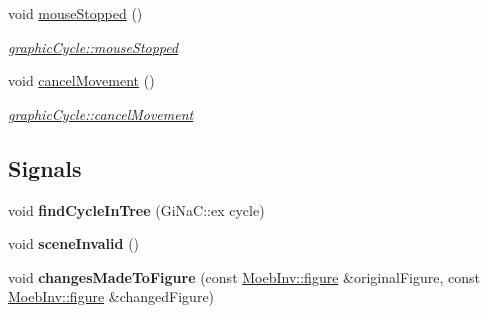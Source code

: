 \begin{DoxyCompactItemize}
void \mbox{\hyperlink{classgraphic_cycle_a173e5e3dfb0dde41c8046a53086e02ab}{mouse\+Stopped}} ()
\begin{DoxyCompactList}\small\item\em \mbox{\hyperlink{classgraphic_cycle_a173e5e3dfb0dde41c8046a53086e02ab}{graphic\+Cycle\+::mouse\+Stopped}} \end{DoxyCompactList}\item 
void \mbox{\hyperlink{classgraphic_cycle_af79bfc4ed813bab595a2a721475a7199}{cancel\+Movement}} ()
\begin{DoxyCompactList}\small\item\em \mbox{\hyperlink{classgraphic_cycle_af79bfc4ed813bab595a2a721475a7199}{graphic\+Cycle\+::cancel\+Movement}} \end{DoxyCompactList}\end{DoxyCompactItemize}
\subsection*{Signals}
\begin{DoxyCompactItemize}
\item 
\mbox{\label{classgraphic_cycle_ae60f6c55734308b7811d0f5ff9116227}} 
void {\bfseries find\+Cycle\+In\+Tree} (Gi\+Na\+C\+::ex cycle)
\item 
\mbox{\label{classgraphic_cycle_aa36164d21bdd1b7cde5b26407f330d49}} 
void {\bfseries scene\+Invalid} ()
\item 
\mbox{\label{classgraphic_cycle_a04f2deb84f4a748e8bb9dba7a43eb653}} 
void {\bfseries changes\+Made\+To\+Figure} (const \mbox{\hyperlink{class_moeb_inv_1_1figure}{Moeb\+Inv\+::figure}} \&original\+Figure, const \mbox{\hyperlink{class_moeb_inv_1_1figure}{Moeb\+Inv\+::figure}} \&changed\+Figure)
\end{DoxyCompactItemize}
